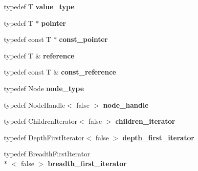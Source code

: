 \begin{DoxyCompactItemize}
\item 
\hypertarget{class_d_o_1_1_tree_a265a253612b46abed17c61b0a5e5ce30}{typedef T {\bfseries value\-\_\-type}}\label{class_d_o_1_1_tree_a265a253612b46abed17c61b0a5e5ce30}

\item 
\hypertarget{class_d_o_1_1_tree_a680c78d51cff3fd301666dd75bdbe49d}{typedef T $\ast$ {\bfseries pointer}}\label{class_d_o_1_1_tree_a680c78d51cff3fd301666dd75bdbe49d}

\item 
\hypertarget{class_d_o_1_1_tree_a53d259f0075b22d7646e373816830e8e}{typedef const T $\ast$ {\bfseries const\-\_\-pointer}}\label{class_d_o_1_1_tree_a53d259f0075b22d7646e373816830e8e}

\item 
\hypertarget{class_d_o_1_1_tree_a9b1a63f171d76a7a3995b6858e99f2ea}{typedef T \& {\bfseries reference}}\label{class_d_o_1_1_tree_a9b1a63f171d76a7a3995b6858e99f2ea}

\item 
\hypertarget{class_d_o_1_1_tree_af9ba3e25df088c62f7d535b91672cda9}{typedef const T \& {\bfseries const\-\_\-reference}}\label{class_d_o_1_1_tree_af9ba3e25df088c62f7d535b91672cda9}

\item 
\hypertarget{class_d_o_1_1_tree_a957b4932a1fe961a3b2f9c3df003afa5}{typedef Node {\bfseries node\-\_\-type}}\label{class_d_o_1_1_tree_a957b4932a1fe961a3b2f9c3df003afa5}

\item 
\hypertarget{class_d_o_1_1_tree_a5aaef33bc2a4eadb7938c46e008ece74}{typedef Node\-Handle$<$ false $>$ {\bfseries node\-\_\-handle}}\label{class_d_o_1_1_tree_a5aaef33bc2a4eadb7938c46e008ece74}

\item 
\hypertarget{class_d_o_1_1_tree_a63679e305245efb895f61220fae8b308}{typedef Children\-Iterator$<$ false $>$ {\bfseries children\-\_\-iterator}}\label{class_d_o_1_1_tree_a63679e305245efb895f61220fae8b308}

\item 
\hypertarget{class_d_o_1_1_tree_a1b68ac2ad80415afa4ab778a852c4880}{typedef Depth\-First\-Iterator$<$ false $>$ {\bfseries depth\-\_\-first\-\_\-iterator}}\label{class_d_o_1_1_tree_a1b68ac2ad80415afa4ab778a852c4880}

\item 
\hypertarget{class_d_o_1_1_tree_ab0764299e60d2534fd17a0e72c3fb546}{typedef Breadth\-First\-Iterator\\*
$<$ false $>$ {\bfseries breadth\-\_\-first\-\_\-iterator}}\label{class_d_o_1_1_tree_ab0764299e60d2534fd17a0e72c3fb546}


\end{DoxyCompactItemize}
